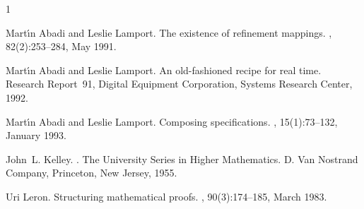 
%
\begin{thebibliography}{1}

Mart\'{\i}n Abadi and Leslie Lamport.
\newblock The existence of refinement mappings.
, 82(2):253--284, May 1991.

Mart\'{\i}n Abadi and Leslie Lamport.
\newblock An old-fashioned recipe for real time.
\newblock Research Report~91, Digital Equipment Corporation, Systems Research
  Center, 1992.

Mart\'{\i}n Abadi and Leslie Lamport.
\newblock Composing specifications.
,
  15(1):73--132, January 1993.

John~L. Kelley.
.
\newblock The University Series in Higher Mathematics. D. Van Nostrand Company,
  Princeton, New Jersey, 1955.

Uri Leron.
\newblock Structuring mathematical proofs.
, 90(3):174--185, March 1983.

\end{thebibliography}


